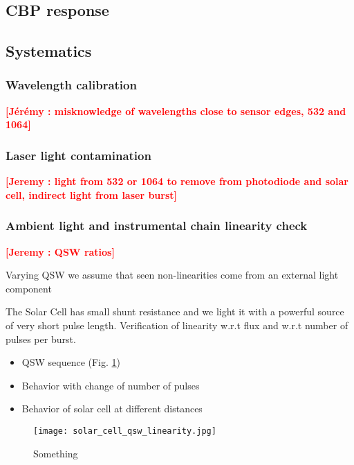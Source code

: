 \documentclass[printer]{aa}
\newcommand{\todo}[1]{\textbf{\textcolor{red}{[#1]}}\xspace}
\begin{document}
\subsection{CBP response}

\subsection{Systematics}

\subsubsection{Wavelength calibration}

\todo{Jérémy : misknowledge of wavelengths close to sensor edges, 532 and 1064}


\subsubsection{Laser light contamination}

\todo{Jeremy : light from 532 or 1064 to remove from photodiode and solar cell, indirect light from laser burst}

\subsubsection{Ambient light and instrumental chain linearity check}

\todo{Jeremy : QSW ratios}

Varying QSW we assume that seen non-linearities come from an external light component

The Solar Cell has small shunt resistance and we light it with a powerful source
of very short pulse length. Verification of linearity w.r.t flux and w.r.t
number of pulses per burst. 


\begin{itemize}
  \item QSW sequence  (Fig. \ref{fig:SCqswlinearity})
  \item Behavior with change of number of pulses
  \item Behavior of solar cell at different distances
\end{itemize}


\begin{figure}[!ht]
\begin{center}
\texttt{[image: solar\_cell\_qsw\_linearity.jpg]}
\end{center}
\caption[]{Something}
\label{fig:SCqswlinearity}
\end{figure}
\end{document}
